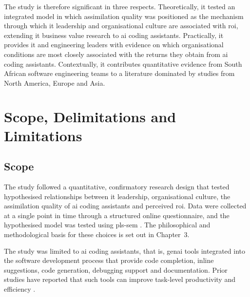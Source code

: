 The study is therefore significant in three respects. Theoretically, it tested an integrated model in which assimilation quality was positioned as the mechanism through which \gls{it} leadership and organisational culture are associated with \gls{roi}, extending \gls{it} business value research \parencite{Enholm2022, Zebec2024} to \gls{ai} coding assistants. Practically, it provides \gls{it} and engineering leaders with evidence on which organisational conditions are most closely associated with the returns they obtain from \gls{ai} coding assistants. Contextually, it contributes quantitative evidence from South African software engineering teams to a literature dominated by studies from North America, Europe and Asia.

\section{Scope, Delimitations and Limitations}
\label{sec:Scope, Delimitations and Limitations} 

\subsection{Scope}
\label{subsec:ch1-scope}
The study followed a quantitative, confirmatory research design that tested hypothesised relationships between \gls{it} leadership, organisational culture, the assimilation quality of \gls{ai} coding assistants and perceived \gls{roi}. Data were collected at a single point in time through a structured online questionnaire, and the hypothesised model was tested using \gls{pls-sem} \parencite{Hair2022, Hair2024}. The philosophical and methodological basis for these choices is set out in Chapter~3.

The study was limited to \gls{ai} coding assistants, that is, \gls{genai} tools integrated into the software development process that provide code completion, inline suggestions, code generation, debugging support and documentation. Prior studies have reported that such tools can improve task-level productivity and efficiency \parencite{Peng2023, Cui2026, Ziegler2024}.

